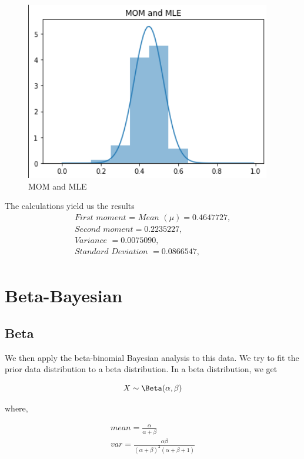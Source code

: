 \documentclass[conference]{IEEEtran}
\begin{document}
    \begin{figure}[htbp]
        \begin{center}
            \centerline{\includegraphics[scale=0.95]{Images/MOM_MLE.png}}
            \caption{MOM and MLE}
        \end{center}
    \end{figure}

    The calculations yield us the results \\
    \begin{align*}
        \textit{First moment = Mean }(\mu) = 0.4647727,\\
        \textit{Second moment} = 0.2235227,\\
        \textit{Variance }= 0.0075090,\\
        \textit{Standard Deviation }= 0.0866547,\\
    \end{align*}

\section{Beta-Bayesian}
    \subsection{Beta}
        \par We then apply the beta-binomial Bayesian analysis to this data. We try to fit the prior data distribution to a beta distribution. In a beta distribution, we get
        
        \[
            X \sim \Beta(\alpha, \beta)
        \]
    
        where,
        
        \begin{gather*}
            \textit{mean} = \frac{\alpha}{\alpha + \beta} \\
            \textit{var} = \frac{\alpha\beta}{(\alpha + \beta)^2(\alpha + \beta + 1)}
        \end{gather*}
            
\end{document}
